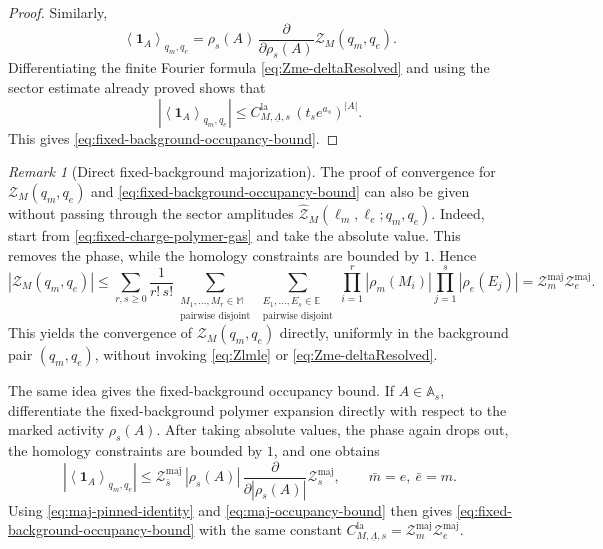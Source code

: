 \documentclass[dvipsnames,a4paper]{article}
\numberwithin{equation}{section}
\theoremstyle{definition}
\theoremstyle{remark}
\newtheorem{remark}[theorem]{Remark}
\begin{document}
\begin{proof}
	Similarly,
	\begin{equation}
		\left\langle \mathbf 1_A \right\rangle_{q_m,q_e}
		=
		\rho_s(A)\,
		\frac{\partial}{\partial \rho_s(A)}
		\mathcal Z_M(q_m,q_e).
	\end{equation}
	Differentiating the finite Fourier formula \eqref{eq:Zme-deltaResolved} and using the
	sector estimate already proved shows that
	\begin{equation}
		\left|
		\left\langle \mathbf 1_A \right\rangle_{q_m,q_e}
		\right|
		\le
		C_{M,\underline\Lambda,s}^{\mathrm{la}}\,(t_s e^{a_s})^{|A|}.
	\end{equation}
	This gives \eqref{eq:fixed-background-occupancy-bound}.
\end{proof}

\begin{remark}[Direct fixed-background majorization]\label{rmk:directZmeBound}
	The proof of convergence for $\mathcal Z_M(q_m,q_e)$ and \eqref{eq:fixed-background-occupancy-bound}
	can also be given without passing through the sector amplitudes
	\(\widehat{\mathcal Z}_M(\ell_m,\ell_e;q_m,q_e)\).  Indeed, start from \eqref{eq:fixed-charge-polymer-gas} and take the absolute value. This removes the phase,
	while the homology constraints are bounded by \(1\). Hence
	\begin{equation}
		|\mathcal Z_M(q_m,q_e)|
		\le
		\sum_{r,s\ge 0}
		\frac{1}{r!\,s!}
		\sum_{\substack{M_1,\dots,M_r\in \mathbb M\\ \text{pairwise disjoint}}}
		\sum_{\substack{E_1,\dots,E_s\in \mathbb E\\ \text{pairwise disjoint}}}
		\prod_{i=1}^r |\rho_m(M_i)|
		\prod_{j=1}^s |\rho_e(E_j)|
		=
		\mathcal Z_m^{\mathrm{maj}}\mathcal Z_e^{\mathrm{maj}}.
	\end{equation}
	This yields the convergence of \(\mathcal Z_M(q_m,q_e)\) directly, uniformly in the
	background pair \((q_m,q_e)\), without invoking \eqref{eq:Zlmle} or
	\eqref{eq:Zme-deltaResolved}.
	
	The same idea gives the fixed-background occupancy bound. If \(A\in\mathbb A_s\),
	differentiate the fixed-background polymer expansion directly with respect to the
	marked activity \(\rho_s(A)\). After taking absolute values, the phase again drops
	out, the homology constraints are bounded by \(1\), and one obtains
	\begin{equation}
		\left|
		\left\langle \mathbf 1_A \right\rangle_{q_m,q_e}
		\right|
		\le
		\mathcal Z_{\bar s}^{\mathrm{maj}}\,
		|\rho_s(A)|\,
		\frac{\partial}{\partial |\rho_s(A)|}\mathcal Z_s^{\mathrm{maj}},
		\qquad
		\bar m=e,\ \bar e=m.
	\end{equation}
	Using \eqref{eq:maj-pinned-identity} and \eqref{eq:maj-occupancy-bound} then gives
	\eqref{eq:fixed-background-occupancy-bound} with the same constant
	\(C_{M,\underline\Lambda,s}^{\mathrm{la}}
	=\mathcal Z_m^{\mathrm{maj}}\mathcal Z_e^{\mathrm{maj}}\).
\end{remark}
\end{document}
